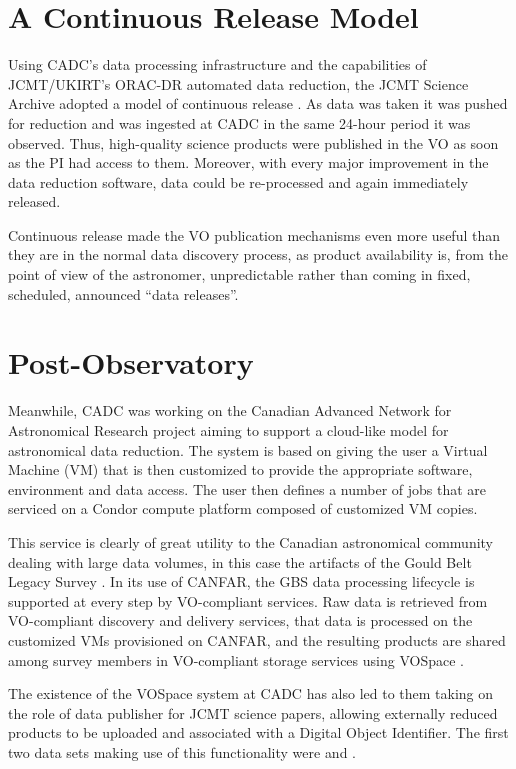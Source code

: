 \documentclass[final,authoryear,5p,times,twocolumn]{elsarticle}
\begin{document}
\section{A Continuous Release Model}

Using CADC's data processing infrastructure and the capabilities of
JCMT/UKIRT's ORAC-DR automated data reduction, the JCMT Science
Archive adopted a model of continuous release
\citep{2011ASPC..442..203E}. As data was taken it was pushed for
reduction and was ingested at CADC in the same 24-hour period it was
observed. Thus, high-quality science products were published in the VO
as soon as the PI had access to them. Moreover, with every major
improvement in the data reduction software, data could be re-processed
and again immediately released.

Continuous release made the VO publication mechanisms even more useful
than they are in the normal data discovery process, as product
availability is, from the point of view of the astronomer,
unpredictable rather than coming in fixed, scheduled, announced ``data
releases''.

\section{Post-Observatory}

Meanwhile, CADC was working on the Canadian Advanced Network for
Astronomical Research \citep[CANFAR;][]{2010SPIE.7740E..51G} project aiming to
support a cloud-like model for astronomical data reduction. The system
is based on giving the user a Virtual Machine (VM) that is then customized to
provide the appropriate software, environment and data access. The
user then defines a number of jobs that are serviced on a Condor
compute platform composed of customized VM copies.

This service is clearly of great utility to the Canadian astronomical
community dealing with large data volumes, in this case the artifacts of
the Gould Belt Legacy Survey \citep[GBS;][]{2007PASP..119..855W}.  In its use of CANFAR, the GBS data
processing lifecycle is supported at every step by VO-compliant services.
Raw data is retrieved from VO-compliant discovery and delivery services,
that data is processed on the customized VMs provisioned on CANFAR, and
the resulting products are shared among survey members in VO-compliant
storage services using VOSpace \citep{vospace}.

The existence of the VOSpace system at CADC has also led to them
taking on the role of data publisher for JCMT science papers, allowing
externally reduced products to be uploaded and associated with a
Digital Object Identifier. The first two data sets making use of this
functionality were \citet{2012MNRAS.424.3050W} and
\citet{2013ApJS..209....8D}.
\end{document}
